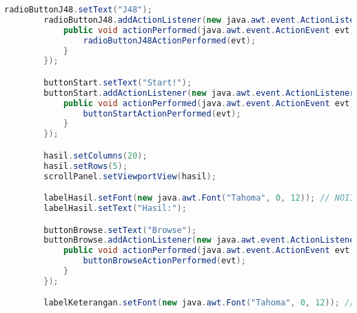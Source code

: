\begin{lstlisting}[language=Java,basicstyle=\tiny,caption=View.java]
        radioButtonJ48.setText("J48");
        radioButtonJ48.addActionListener(new java.awt.event.ActionListener() {
            public void actionPerformed(java.awt.event.ActionEvent evt) {
                radioButtonJ48ActionPerformed(evt);
            }
        });

        buttonStart.setText("Start!");
        buttonStart.addActionListener(new java.awt.event.ActionListener() {
            public void actionPerformed(java.awt.event.ActionEvent evt) {
                buttonStartActionPerformed(evt);
            }
        });

        hasil.setColumns(20);
        hasil.setRows(5);
        scrollPanel.setViewportView(hasil);

        labelHasil.setFont(new java.awt.Font("Tahoma", 0, 12)); // NOI18N
        labelHasil.setText("Hasil:");

        buttonBrowse.setText("Browse");
        buttonBrowse.addActionListener(new java.awt.event.ActionListener() {
            public void actionPerformed(java.awt.event.ActionEvent evt) {
                buttonBrowseActionPerformed(evt);
            }
        });

        labelKeterangan.setFont(new java.awt.Font("Tahoma", 0, 12)); // NOI18N


\end{lstlisting}
